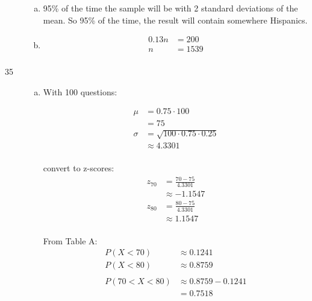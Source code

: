 \documentclass[letterpaper, landscape]{exam}
\begin{document}
\begin{description}
\begin{enumerate}[(a)]
          \item 95\% of the time the sample will be with 2 standard deviations
            of the mean. So 95\% of the time, the result will contain somewhere
             Hispanics.

          \item 
            \begin{align*}
              0.13 n & = 200 \\
              n      & = \boxed{ 1539 } \\
            \end{align*}
        
        \end{enumerate}

      \item[35]
        \begin{enumerate}[(a)]
          \item
            With 100 questions:

            \begin{align*}
              \mu    & = 0.75 \cdot 100 \\
                     & = 75 \\
              \sigma & = \sqrt{100 \cdot 0.75 \cdot 0.25} \\
                     & \approx 4.3301 \\
            \end{align*}

            convert to z-scores:
            \begin{align*}
              z_{70} & = \frac{70 - 75}{4.3301} \\
                     & \approx -1.1547 \\
              z_{80} & = \frac{80 - 75}{4.3301} \\
                     & \approx 1.1547 \\
            \end{align*}

            From Table A\@:
            \begin{align*}
              P(X < 70) & \approx 0.1241 \\
              P(X < 80) & \approx 0.8759 \\
              \\
              P(70 < X < 80) & \approx 0.8759 - 0.1241 \\
                             & = \boxed{ 0.7518 } \\
            \end{align*}


\end{enumerate}
\end{description}
\end{document}
